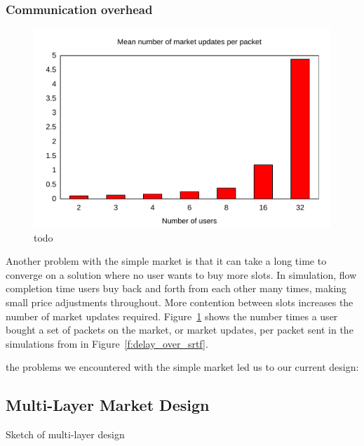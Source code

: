 \subsubsection{Communication overhead}

\begin{figure}
\includegraphics[width=\columnwidth]{plots/num_market_updates.pdf}
\caption{todo}
\label{f:num_market_updates}
\end{figure}

Another problem with the simple market is that it can take a long time to converge on a solution where no user wants to buy more slots. In simulation, flow completion time users buy back and forth from each other many times, making small price adjustments throughout. More contention between slots increases the number of market updates required. 
Figure~\ref{f:num_market_updates} shows the number times a user bought a set of packets on the market, or market updates, per packet sent in the simulations from in Figure~\ref{f:delay_over_srtf}.


the problems we encountered with the simple market led us to our current design:
\subsection{Multi-Layer Market Design}

Sketch of multi-layer design
